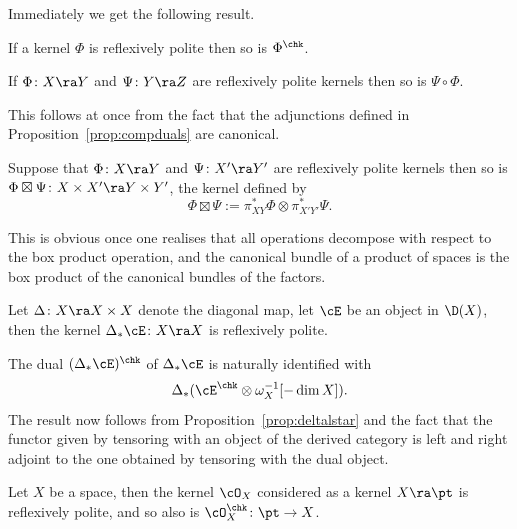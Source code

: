 \noindent Immediately we get the following result.

\begin{Proposition}
  If a kernel $\Phi$ is reflexively polite then so is $\Phi^\chk$.
\end{Proposition}

\begin{Proposition}
\label{prop:politecompduals}
If $\Phi\colon X \ra Y$ and $\Psi\colon Y \ra Z$ are reflexively
polite kernels then so is $\Psi \circ \Phi$.
\end{Proposition}

\begin{Proof}
  This follows at once from the fact that the adjunctions defined in
  Proposition~\ref{prop:compduals} are canonical.
\end{Proof}

\begin{Proposition}
\label{prop:dualbox}
Suppose that $\Phi\colon X\ra Y$ and $\Psi\colon X'\ra Y'$ are
reflexively polite kernels then so is $\Phi\boxtimes \Psi\colon X
\times X' \ra Y\times Y'$, the kernel defined by
\[ \Phi\boxtimes \Psi := \pi_{XY}^* \Phi \otimes \pi_{X'Y'}^*\Psi. \]
\end{Proposition}

\begin{Proof}
  This is obvious once one realises that all operations decompose with
  respect to the box product operation, and the canonical bundle of a
  product of spaces is the box product of the canonical bundles of the
  factors.
\end{Proof}

\begin{Proposition}
\label{prop:dualker}
Let $\Delta\colon X \ra X\times X$ denote the diagonal map, let $\cE$
be an object in $\D(X)$, then the kernel $\Delta_*\cE\colon X \ra X$
is reflexively polite.
\end{Proposition}

\begin{Proof}
  The dual $(\Delta_*\cE)^\chk$ of $\Delta_*\cE$ is naturally
  identified with 
  \[ \Delta_* (\cE^\chk \otimes \omega_X^{-1}[-\dim X]). \] The result
  now follows from Proposition~\ref{prop:deltalstar} and the fact that
  the functor given by tensoring with an object of the derived
  category is left and right adjoint to the one obtained by tensoring
  with the dual object.
\end{Proof}

\begin{Proposition}
\label{prop:dualcox}
Let $X$ be a space, then the kernel $\cO_X$ considered as a kernel
$X\ra \pt$ is reflexively polite, and so also is $\cO_X^\chk\colon
\pt\to X$.
\end{Proposition}

